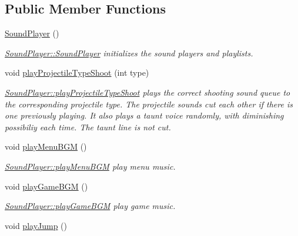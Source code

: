 \subsection*{Public Member Functions}
\begin{DoxyCompactItemize}
\item 
\hyperlink{class_sound_player_ac7107aecd54bdcfac29486487768ebc6}{Sound\+Player} ()\hypertarget{class_sound_player_ac7107aecd54bdcfac29486487768ebc6}{}\label{class_sound_player_ac7107aecd54bdcfac29486487768ebc6}

\begin{DoxyCompactList}\small\item\em \hyperlink{class_sound_player_ac7107aecd54bdcfac29486487768ebc6}{Sound\+Player\+::\+Sound\+Player} initializes the sound players and playlists. \end{DoxyCompactList}\item 
void \hyperlink{class_sound_player_a22e1a489bbbb6cfcab3662c41f8168bc}{play\+Projectile\+Type\+Shoot} (int type)
\begin{DoxyCompactList}\small\item\em \hyperlink{class_sound_player_a22e1a489bbbb6cfcab3662c41f8168bc}{Sound\+Player\+::play\+Projectile\+Type\+Shoot} plays the correct shooting sound queue to the corresponding projectile type. The projectile sounds cut each other if there is one previously playing. It also plays a taunt voice randomly, with diminishing possibiliy each time. The taunt line is not cut. \end{DoxyCompactList}\item 
void \hyperlink{class_sound_player_afcffc7d0a0437906496aff6ea1669193}{play\+Menu\+B\+GM} ()\hypertarget{class_sound_player_afcffc7d0a0437906496aff6ea1669193}{}\label{class_sound_player_afcffc7d0a0437906496aff6ea1669193}

\begin{DoxyCompactList}\small\item\em \hyperlink{class_sound_player_afcffc7d0a0437906496aff6ea1669193}{Sound\+Player\+::play\+Menu\+B\+GM} play menu music. \end{DoxyCompactList}\item 
void \hyperlink{class_sound_player_a896f537cc0518edc7a724554ec35cf27}{play\+Game\+B\+GM} ()\hypertarget{class_sound_player_a896f537cc0518edc7a724554ec35cf27}{}\label{class_sound_player_a896f537cc0518edc7a724554ec35cf27}

\begin{DoxyCompactList}\small\item\em \hyperlink{class_sound_player_a896f537cc0518edc7a724554ec35cf27}{Sound\+Player\+::play\+Game\+B\+GM} play game music. \end{DoxyCompactList}\item 
void \hyperlink{class_sound_player_a854749ef29c5620f8b3b6355b7015d01}{play\+Jump} ()\hypertarget{class_sound_player_a854749ef29c5620f8b3b6355b7015d01}{}\label{class_sound_player_a854749ef29c5620f8b3b6355b7015d01}


\end{DoxyCompactItemize}
